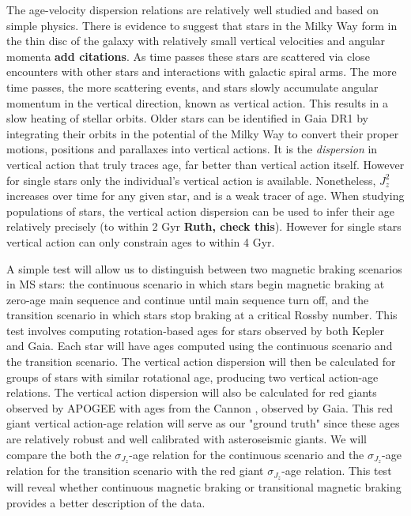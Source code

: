 \documentclass[12pt]{article}
\begin{document}
The age-velocity dispersion relations are relatively well studied and based on
simple physics.
There is evidence to suggest that stars in the Milky Way form in the thin disc
of the galaxy with relatively small vertical velocities and angular momenta
{\bf add citations}.
As time passes these stars are scattered via close encounters with other
stars and interactions with galactic spiral arms.
The more time passes, the more scattering events, and stars slowly accumulate
angular momentum in the vertical direction, known as vertical action.
This results in a slow heating of stellar orbits.
Older stars can be identified in Gaia DR1 by integrating their orbits in the
potential of the Milky Way to convert their proper motions, positions and
parallaxes into vertical actions.
It is the {\it dispersion} in vertical action that truly traces age, far
better than vertical action itself.
However for single stars only the individual's vertical action is available.
Nonetheless, $J_z^2$ increases over time for any given star, and is a weak
tracer of age.
When studying populations of stars, the vertical action dispersion can be used
to infer their age relatively precisely (to within 2 Gyr
{\bf Ruth, check this}).
However for single stars vertical action can only constrain ages to within 4
Gyr.

A simple test will allow us to distinguish between two magnetic braking
scenarios in MS stars: the continuous scenario in which stars begin magnetic
braking at zero-age main sequence and continue until main sequence turn off,
and the transition scenario in which stars stop braking at a critical Rossby
number.
This test involves computing rotation-based ages for stars observed by both
Kepler and Gaia.
Each star will have ages computed using the continuous scenario and the
transition scenario.
The vertical action dispersion will then be calculated for groups of stars
with similar rotational age, producing two vertical action-age relations.
The vertical action dispersion will also be calculated for red giants observed
by APOGEE with ages from the Cannon \citep{Ness2015}, observed by Gaia.
This red giant vertical action-age relation will serve as our "ground truth"
since these ages are relatively robust and well calibrated with asteroseismic
giants.
We will compare the both the $\sigma_{J_z}$-age relation for the continuous
scenario and the $\sigma_{J_z}$-age relation for the transition scenario with
the red giant $\sigma_{J_z}$-age relation.
This test will reveal whether continuous magnetic braking or transitional
magnetic braking provides a better description of the data.
\end{document}
